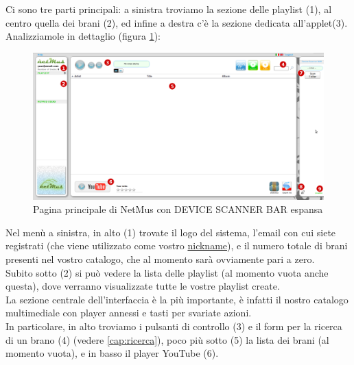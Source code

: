 Ci sono tre parti principali: a sinistra troviamo la sezione delle
playlist (1), al centro quella dei brani (2), ed infine a destra c'\`e la
sezione dedicata all'applet(3).\\

Analizziamole in dettaglio (figura \ref{fig:appletbarAperta}):\\

\begin{figure}[!htbp]
  \centering
  \includegraphics[width=14cm]{img/MU/applet_bar_open.png}
\caption{Pagina principale di NetMus con DEVICE SCANNER BAR espansa}
\label{fig:appletbarAperta}
\end{figure} 

\newpage
Nel men\`u a sinistra, in alto (1) trovate il logo del sistema,
l'email con cui siete registrati (che viene utilizzato come vostro
\underline{nickname}), e il numero totale di brani presenti nel vostro catalogo,
che al momento sar\`a ovviamente pari a zero.\\
Subito sotto (2) si pu\`o vedere la lista delle playlist (al momento vuota
anche questa), dove verranno visualizzate tutte le vostre playlist create.\\

La sezione centrale dell'interfaccia \`e la pi\`u importante, \`e infatti il
nostro catalogo multimediale con player annessi e tasti per svariate azioni.\\
In particolare, in alto troviamo i pulsanti di controllo (3) e il form per la
ricerca di un brano (4) (vedere \ref{cap:ricerca}), poco pi\`u sotto (5) la
lista dei brani (al momento vuota), e in basso il player YouTube (6).\\

